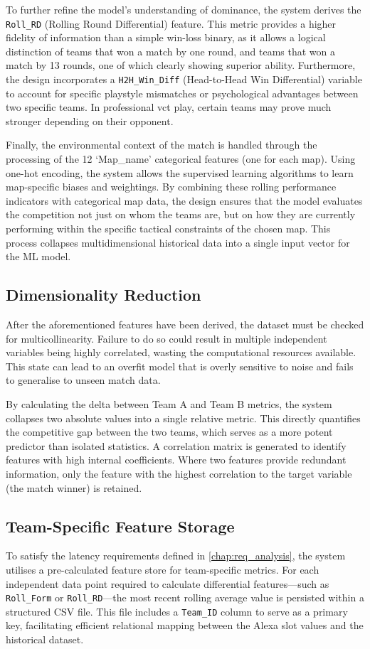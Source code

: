 To further refine the model's understanding of dominance, the system derives the \texttt{Roll\_RD} (Rolling Round Differential) feature. This metric provides a higher fidelity of information than a simple win-loss binary, as it allows a logical distinction of teams that won a match by one round, and teams that won a match by 13 rounds, one of which clearly showing superior ability. Furthermore, the design incorporates a \texttt{H2H\_Win\_Diff} (Head-to-Head Win Differential) variable to account for specific playstyle mismatches or psychological advantages between two specific teams. In professional \gls{vct} play, certain teams may prove much stronger depending on their opponent.

Finally, the environmental context of the match is handled through the processing of the 12 `Map\_name' categorical features (one for each map). Using one-hot encoding, the system allows the supervised learning algorithms to learn map-specific biases and weightings. By combining these rolling performance indicators with categorical map data, the design ensures that the model evaluates the competition not just on whom the teams are, but on how they are currently performing within the specific tactical constraints of the chosen map. This process collapses multidimensional historical data into a single input vector for the ML model.

\subsection{Dimensionality Reduction}
After the aforementioned features have been derived, the dataset must be checked for multicollinearity. Failure to do so could result in multiple independent variables being highly correlated, wasting the computational resources available. This state can lead to an overfit model that is overly sensitive to noise and fails to generalise to unseen match data.

By calculating the delta between Team A and Team B metrics, the system collapses two absolute values into a single relative metric. This directly quantifies the competitive gap between the two teams, which serves as a more potent predictor than isolated statistics. A correlation matrix is generated to identify features with high internal coefficients. Where two features provide redundant information, only the feature with the highest correlation to the target variable (the match winner) is retained.

\subsection{Team-Specific Feature Storage}
\label{sub:featureStorage}
To satisfy the latency requirements defined in \autoref{chap:req_analysis}, the system utilises a pre-calculated feature store for team-specific metrics. For each independent data point required to calculate differential features---such as \texttt{Roll\_Form} or \texttt{Roll\_RD}---the most recent rolling average value is persisted within a structured CSV file. This file includes a \texttt{Team\_ID} column to serve as a primary key, facilitating efficient relational mapping between the Alexa slot values and the historical dataset.

